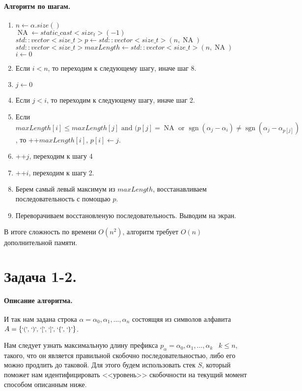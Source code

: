 \documentclass[12pt]{article}
\newcommand{\sgn}{\operatorname{sgn}}
\newcommand{\NA}{\operatorname{NA}}
\begin{document}
\paragraph{Алгоритм по шагам.}
\begin{enumerate}
    \item $ n \leftarrow \alpha.size() $ \\
          $ \NA \leftarrow static\_cast<size_t> (-1)$ \\
          $ std::vector<size\_t> p \leftarrow std::vector<size\_t>(n, \NA) $ \\
          $ std::vector<size\_t> maxLength \leftarrow std::vector<size\_t>(n, \NA)$
          $ i \leftarrow 0 $
    \item Если $ i < n $, то переходим к следующему шагу, иначе шаг 8.
    \item $ j \leftarrow 0 $
    \item Если $ j < i $, то переходим к следующему шагу, иначе шаг 2.
    \item Если $ maxLength[i] \le maxLength[j] \mbox{   and   } (p[j] = \NA \mbox{   or   } \sgn(\alpha_j - \alpha_i) \ne \sgn(\alpha_j - \alpha_{p[j]}) $,
          то ++$maxLength[i]$, $ p[i] \leftarrow j $.
    \item ++$j$, переходим к шагу 4
    \item ++$i$, переходим к шагу 2.
    \item Берем самый левый максимум из $ maxLength $, восстанавливаем последовательность с помощью $ p $.
    \item Переворачиваем восстановленую последовательность. Выводим на экран.
\end{enumerate}
В итоге сложность по времени $ O(n^2) $, алгоритм требует $ O(n) $ дополнительной памяти.




\section{Задача 1-2.} 
\paragraph{Описание алгоритма.}
И так нам задана строка $ \alpha = \alpha_0, \alpha_1, ..., \alpha_n$ состоящяя
из символов алфавита 
$ A = \left\{ 
    \mbox{\footnotesize{`(', `)', `[', `]', `\{', `\}'}}
\right\} $.

Нам следует узнать максимальную длину префикса $ p_{\alpha} = \alpha_0, \alpha_1, ..., \alpha_k \;\;\; k \le n$, такого, что он является
правильной скобочно последовательностью, либо его можно продлить до таковой. Для этого будем использовать стек $ S $,
который поможет нам идентифицировать <<уровень>> скобочности на текущий момент способом
описанным ниже.
\end{document}
